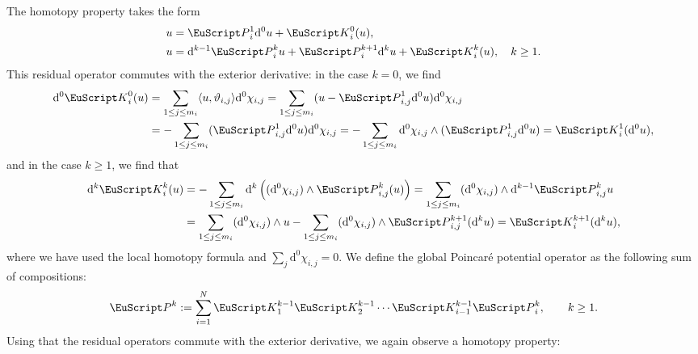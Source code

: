 \documentclass[10pt,a4paper]{amsart}
\theoremstyle{definition}
\theoremstyle{remark}
\numberwithin{equation}{section}
\newcommand{\euK}{{\EuScript K}}
\newcommand{\euP}{{\EuScript P}}
\newcommand{\cartan}{{\mathrm d}}
\newcommand{\Poincare}{\euP}
\newcommand{\Defect}{\euK}
\newcommand{\weight}{\vartheta}
\begin{document}
The homotopy property takes the form 
\begin{align*}
    &
    u = \Poincare^{1}_{i} \cartan^{0} u + \Defect^{0}_{i}(u),
    \\
    &
    u = \cartan^{k-1} \Poincare^{k}_{i} u + \Poincare^{k+1}_{i} \cartan^{k} u + \Defect^{k}_{i}(u), \quad k \geq 1
    .
\end{align*}
This residual operator commutes with the exterior derivative:
in the case $k = 0$, we find
\begin{align*}
    \cartan^{0} \Defect^{0}_{i}(u)
    &
    =
    \sum_{1 \leq j \leq m_{i}} 
    \langle u, \weight_{i,j} \rangle \cartan^{0} \chi_{i,j} 
    =
    \sum_{1 \leq j \leq m_{i}} 
    ( u - \Poincare^{1}_{i,j} \cartan^{0} u ) \cartan^{0} \chi_{i,j} 
    \\&
    =
    -
    \sum_{1 \leq j \leq m_{i}} 
    ( \Poincare^{1}_{i,j} \cartan^{0} u ) \cartan^{0} \chi_{i,j}
    =
    -
    \sum_{1 \leq j \leq m_{i}} 
    \cartan^{0} \chi_{i,j} \wedge ( \Poincare^{1}_{i,j} \cartan^{0} u )
    =
    \Defect^{1}_{i}( \cartan^{0} u) 
    ,
\end{align*}
and in the case $k \geq 1$, we find that 
\begin{align*}
    \cartan^{k} \Defect^{k}_{i}( u )
    &
    =
    -\sum_{1 \leq j \leq m_{i}}
    \cartan^{k}\left( ( \cartan^{0} \chi_{i,j} ) \wedge \Poincare^{k}_{i,j}(u) \right)
    =
    \sum_{1 \leq j \leq m_{i}}
    ( \cartan^{0} \chi_{i,j} ) \wedge \cartan^{k-1} \Poincare^{k}_{i,j} u
    \\&
    =
    \sum_{1 \leq j \leq m_{i}}
    ( \cartan^{0} \chi_{i,j} ) \wedge u
    -
    \sum_{1 \leq j \leq m_{i}}
    ( \cartan^{0} \chi_{i,j} ) \wedge \Poincare^{k+1}_{i,j}( \cartan^{k} u)
    =
    \Defect^{k+1}_{i}( \cartan^{k} u)
    ,
\end{align*}
where we have used the local homotopy formula and $\sum_{j} \cartan^{0} \chi_{i,j} = 0$. 
We define the global Poincar\'e potential operator as the following sum of compositions:
\begin{align*}
    \Poincare^{k} 
    := 
    \sum_{i=1}^{N} \Defect^{k-1}_{1} \Defect^{k-1}_{2} \cdots \Defect^{k-1}_{i-1} \Poincare^{k}_{i}
    ,
    \qquad 
    k \geq 1
    . 
\end{align*}
Using that the residual operators commute with the exterior derivative, we again observe a homotopy property:
\end{document}
